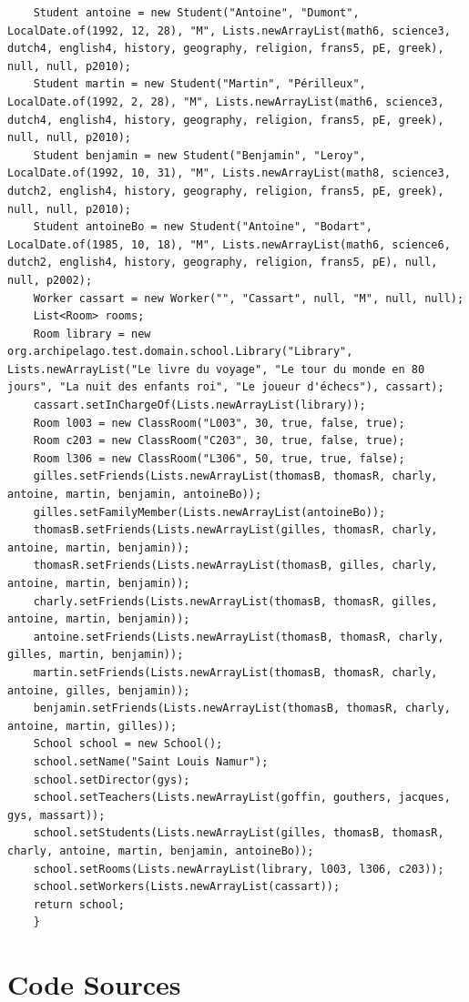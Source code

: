 \documentclass[a4paper,fleqn,12pt]{report}
\begin{document}
\begin{lstlisting}
    Student antoine = new Student("Antoine", "Dumont", LocalDate.of(1992, 12, 28), "M", Lists.newArrayList(math6, science3, dutch4, english4, history, geography, religion, frans5, pE, greek), null, null, p2010);
    Student martin = new Student("Martin", "Périlleux", LocalDate.of(1992, 2, 28), "M", Lists.newArrayList(math6, science3, dutch4, english4, history, geography, religion, frans5, pE, greek), null, null, p2010);
    Student benjamin = new Student("Benjamin", "Leroy", LocalDate.of(1992, 10, 31), "M", Lists.newArrayList(math8, science3, dutch2, english4, history, geography, religion, frans5, pE, greek), null, null, p2010);
    Student antoineBo = new Student("Antoine", "Bodart", LocalDate.of(1985, 10, 18), "M", Lists.newArrayList(math6, science6, dutch2, english4, history, geography, religion, frans5, pE), null, null, p2002);
    Worker cassart = new Worker("", "Cassart", null, "M", null, null);
    List<Room> rooms;
    Room library = new org.archipelago.test.domain.school.Library("Library", Lists.newArrayList("Le livre du voyage", "Le tour du monde en 80 jours", "La nuit des enfants roi", "Le joueur d'échecs"), cassart);
    cassart.setInChargeOf(Lists.newArrayList(library));
    Room l003 = new ClassRoom("L003", 30, true, false, true);
    Room c203 = new ClassRoom("C203", 30, true, false, true);
    Room l306 = new ClassRoom("L306", 50, true, true, false);
    gilles.setFriends(Lists.newArrayList(thomasB, thomasR, charly, antoine, martin, benjamin, antoineBo));
    gilles.setFamilyMember(Lists.newArrayList(antoineBo));
    thomasB.setFriends(Lists.newArrayList(gilles, thomasR, charly, antoine, martin, benjamin));
    thomasR.setFriends(Lists.newArrayList(thomasB, gilles, charly, antoine, martin, benjamin));
    charly.setFriends(Lists.newArrayList(thomasB, thomasR, gilles, antoine, martin, benjamin));
    antoine.setFriends(Lists.newArrayList(thomasB, thomasR, charly, gilles, martin, benjamin));
    martin.setFriends(Lists.newArrayList(thomasB, thomasR, charly, antoine, gilles, benjamin));
    benjamin.setFriends(Lists.newArrayList(thomasB, thomasR, charly, antoine, martin, gilles));
    School school = new School();
    school.setName("Saint Louis Namur");
    school.setDirector(gys);
    school.setTeachers(Lists.newArrayList(goffin, gouthers, jacques, gys, massart));
    school.setStudents(Lists.newArrayList(gilles, thomasB, thomasR, charly, antoine, martin, benjamin, antoineBo));
    school.setRooms(Lists.newArrayList(library, l003, l306, c203));
    school.setWorkers(Lists.newArrayList(cassart));
    return school;
    }
\end{lstlisting}
\label{SchoolObj}

\chapter*{Code Sources}

%

 
\end{document}
